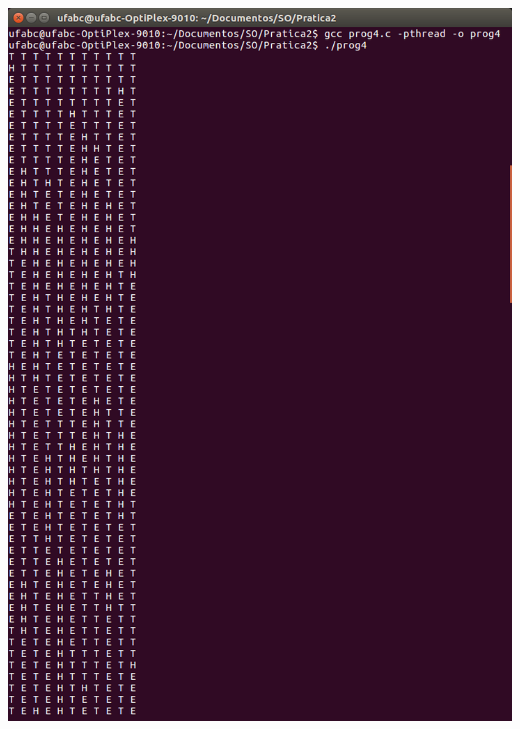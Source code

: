 \vspace{2em}
\begin{minipage}{\textwidth}
    \hspace{-1em}
    \centering
    \begin{minipage}[b]{0.49\textwidth}
        \centering
        \includegraphics[scale=.3]{pratica2/prog4.png}
        \label{prog5kill1png}
    \end{minipage}
    \hfill
    \begin{minipage}[b]{0.49\textwidth}
        \centering

\end{minipage}
\end{minipage}
